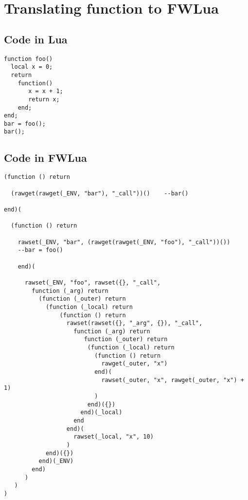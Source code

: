 \chapter{Translating function to FWLua\label{app:function}}

\section{Code in Lua}

\begin{verbatim}
function foo()
  local x = 0;
  return 
    function() 
       x = x + 1;
       return x; 
    end;
end;
bar = foo();
bar();
\end{verbatim}

\newpage
\section{Code in FWLua}

\begin{verbatim}
(function () return 

  (rawget(rawget(_ENV, "bar"), "_call"))()    --bar()
  
end)(
  
  (function () return
  
    rawset(_ENV, "bar", (rawget(rawget(_ENV, "foo"), "_call"))())   
    --bar = foo()
    
    end)(
   
      rawset(_ENV, "foo", rawset({}, "_call",
        function (_arg) return
          (function (_outer) return
            (function (_local) return
                (function () return             
                  rawset(rawset({}, "_arg", {}), "_call",
                    function (_arg) return
                       function (_outer) return
                        (function (_local) return
                          (function () return
                            rawget(_outer, "x")
                          end)(
                            rawset(_outer, "x", rawget(_outer, "x") + 1)
                          )  
                        end)({})
                      end)(_local)
                    end                  
                  end)(              
                    rawset(_local, "x", 10)                
                  )
            end)({})
          end)(_ENV)
        end)
      )
   )
)



\end{verbatim}
